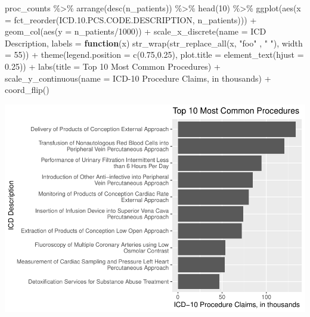 \documentclass[preprint, 3p,
authoryear]{elsarticle} %
\newenvironment{Shaded}{\begin{snugshade}}{\end{snugshade}}
\newcommand{\AttributeTok}[1]{\textcolor[rgb]{0.77,0.63,0.00}{#1}}
\newcommand{\ControlFlowTok}[1]{\textcolor[rgb]{0.13,0.29,0.53}{\textbf{#1}}}
\newcommand{\DecValTok}[1]{\textcolor[rgb]{0.00,0.00,0.81}{#1}}
\newcommand{\FloatTok}[1]{\textcolor[rgb]{0.00,0.00,0.81}{#1}}
\newcommand{\FunctionTok}[1]{\textcolor[rgb]{0.00,0.00,0.00}{#1}}
\newcommand{\NormalTok}[1]{#1}
\newcommand{\SpecialCharTok}[1]{\textcolor[rgb]{0.00,0.00,0.00}{#1}}
\newcommand{\StringTok}[1]{\textcolor[rgb]{0.31,0.60,0.02}{#1}}
\begin{document}
\begin{Shaded}
\begin{Highlighting}[]
\NormalTok{proc\_counts }\SpecialCharTok{\%\textgreater{}\%}
  \FunctionTok{arrange}\NormalTok{(}\FunctionTok{desc}\NormalTok{(n\_patients)) }\SpecialCharTok{\%\textgreater{}\%}
  \FunctionTok{head}\NormalTok{(}\DecValTok{10}\NormalTok{) }\SpecialCharTok{\%\textgreater{}\%}
  \FunctionTok{ggplot}\NormalTok{(}\FunctionTok{aes}\NormalTok{(}\AttributeTok{x =} \FunctionTok{fct\_reorder}\NormalTok{(ICD.}\FloatTok{10.}\NormalTok{PCS.CODE.DESCRIPTION, n\_patients))) }\SpecialCharTok{+}
  \FunctionTok{geom\_col}\NormalTok{(}\FunctionTok{aes}\NormalTok{(}\AttributeTok{y =}\NormalTok{ n\_patients}\SpecialCharTok{/}\DecValTok{1000}\NormalTok{)) }\SpecialCharTok{+} 
  \FunctionTok{scale\_x\_discrete}\NormalTok{(}\AttributeTok{name =} \StringTok{\textquotesingle{}ICD Description\textquotesingle{}}\NormalTok{, }\AttributeTok{labels =} \ControlFlowTok{function}\NormalTok{(x) }\FunctionTok{str\_wrap}\NormalTok{(}\FunctionTok{str\_replace\_all}\NormalTok{(x, }\StringTok{"foo"}\NormalTok{ , }\StringTok{" "}\NormalTok{), }\AttributeTok{width =} \DecValTok{55}\NormalTok{)) }\SpecialCharTok{+}
  \FunctionTok{theme}\NormalTok{(}\AttributeTok{legend.position =} \FunctionTok{c}\NormalTok{(}\FloatTok{0.75}\NormalTok{,}\FloatTok{0.25}\NormalTok{), }\AttributeTok{plot.title =} \FunctionTok{element\_text}\NormalTok{(}\AttributeTok{hjust =} \FloatTok{0.25}\NormalTok{)) }\SpecialCharTok{+}
  \FunctionTok{labs}\NormalTok{(}\AttributeTok{title =} \StringTok{\textquotesingle{}Top 10 Most Common Procedures\textquotesingle{}}\NormalTok{) }\SpecialCharTok{+}
  \FunctionTok{scale\_y\_continuous}\NormalTok{(}\AttributeTok{name =} \StringTok{\textquotesingle{}ICD{-}10 Procedure Claims, in thousands\textquotesingle{}}\NormalTok{) }\SpecialCharTok{+}
  \FunctionTok{coord\_flip}\NormalTok{() }
\end{Highlighting}
\end{Shaded}

\includegraphics{final-project-paper_files/figure-latex/top-10-procedures-1.pdf}
\end{document}
